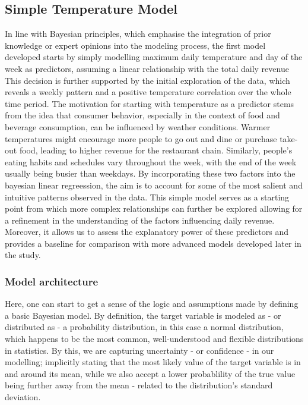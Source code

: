 \subsection{Simple Temperature Model}
In line with Bayesian principles, which emphasise the integration of prior
knowledge or expert opinions into the modeling process, the first model
developed starts by simply modelling maximum daily temperature and day of the
week as predictors, assuming a linear relationship with the total daily revenue
This decision is further supported by the initial exploration of the data,
which reveals a weekly pattern and a positive temperature correlation over the
whole time period.
The motivation for starting with temperature as a predictor stems from the idea
that consumer behavior, especially in the context of food and beverage
consumption, can be influenced by weather conditions. Warmer temperatures might
encourage more people to go out and dine or purchase take-out food, leading to
higher revenue for the restaurant chain. Similarly, people's eating habits and
schedules vary throughout the week, with the end of the week usually being
busier than weekdays.
By incorporating these two factors into the bayesian linear regreession, the
aim is to account for some of the most salient and intuitive patterns observed
in the data. This simple model serves as a starting point from which more
complex relationships can further be explored allowing for a refinement in the
understanding of the factors influencing daily revenue. Moreover, it allows us
to assess the explanatory power of these predictors and provides a baseline for
comparison with more advanced models developed later in the study.

\subsubsection{Model architecture}

Here, one can start to get a sense of the logic and assumptions made by
defining a basic Bayesian model. By definition, the target variable is modeled
as - or distributed as - a probability distribution, in this case a normal
distribution, which happens to be the most common, well-understood and flexible
distributions in statistics. By this, we are capturing uncertainty - or
confidence - in our modelling; implicitly stating that the most likely value of
the target variable is in and around its mean, while we also accept a lower
probablility of the true value being further away from the mean - related to
the distribution's standard deviation.

